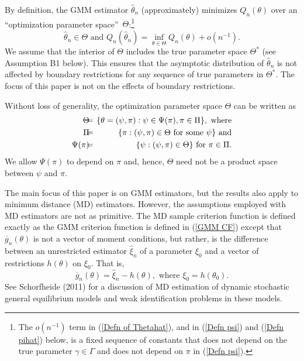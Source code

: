 \documentclass[12pt,titlepage,final,oneside,letterpaper]{article}
\begin{document}
By definition, the GMM estimator $\widehat{\theta }_{n}$ (approximately)
minimizes $Q_{n}(\theta )$ over an \textquotedblleft optimization parameter
space\textquotedblright\ $\Theta $:\footnote{%
The $o(n^{-1})$ term in (\ref{Defn of Thetahat}), and in (\ref{Defn psi})
and (\ref{Defn pihat}) below, is a fixed sequence of constants that does not
depend on the true parameter $\gamma \in \Gamma $ and does not depend on $%
\pi $ in (\ref{Defn psi}).}%
\begin{equation}
\widehat{\theta }_{n}\in \Theta \text{ and }Q_{n}(\widehat{\theta }%
_{n})=\inf_{\theta \in \Theta }Q_{n}(\theta )+o(n^{-1}).
\label{Defn of Thetahat}
\end{equation}%
We assume that the interior of $\Theta $ includes the true parameter space $%
\Theta ^{\ast }$ (see Assumption B1 below). This ensures that the asymptotic
distribution of $\widehat{\theta }_{n}$ is not affected by boundary
restrictions for any sequence of true parameters in $\Theta ^{\ast }.$ The
focus of this paper is not on the effects of boundary restrictions.

Without loss of generality, the optimization parameter space $\Theta $ can
be written as%
\begin{eqnarray}
\Theta \hspace{-0.08in} &=&\hspace{-0.08in}\{\theta =(\psi ,\pi ):\psi \in
\Psi (\pi ),\pi \in \Pi \},\text{ where}  \notag \\
\Pi \hspace{-0.08in} &=&\hspace{-0.08in}\{\pi :(\psi ,\pi )\in \Theta \text{
for some }\psi \}\text{ and}  \notag \\
\Psi (\pi )\hspace{-0.08in} &=&\hspace{-0.08in}\{\psi :(\psi ,\pi )\in
\Theta \}\text{ for }\pi \in \Pi .  \label{Defn of Par Sp Pi and Psi}
\end{eqnarray}%
We allow $\Psi (\pi )$ to depend on $\pi $ and, hence, $\Theta $ need not be
a product space between $\psi $ and $\pi .$

The main focus of this paper is on GMM estimators, but the results also
apply to minimum distance (MD) estimators. However, the assumptions employed
with MD estimators are not as primitive. The MD sample criterion function is
defined exactly as the GMM criterion function is defined in (\ref{GMM CF})
except that $\overline{g}_{n}(\theta )$ is not a vector of moment
conditions, but rather, is the difference between an unrestricted estimator $%
\widehat{\xi }_{n}$ of a parameter $\xi _{0}$ and a vector of restrictions $%
h(\theta )$ on $\xi _{0}.$ That is, 
\begin{equation}
\overline{g}_{n}(\theta )=\widehat{\xi }_{n}-h(\theta ),\text{ where }\xi
_{0}=h(\theta _{0}).  \label{MD defn}
\end{equation}%
See Schorfheide (2011) for a discussion of MD estimation of dynamic
stochastic general equilibrium models and weak identification problems in
these models.
\end{document}
